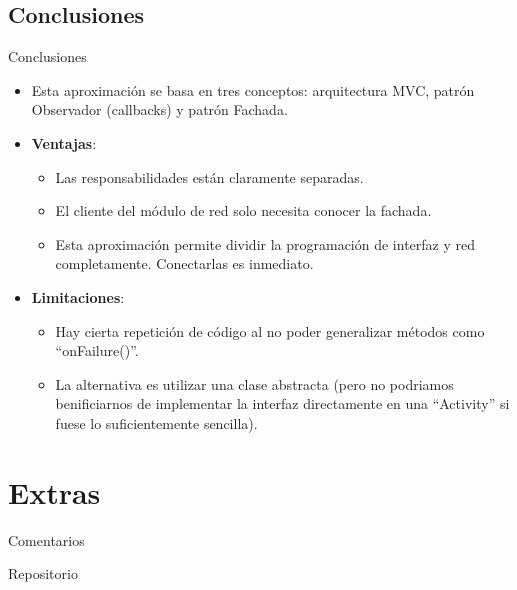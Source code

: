 \documentclass{beamer}
\begin{document}
\subsection{Conclusiones}
\begin{frame}[fragile]{Conclusiones}
\begin{itemize}
\item Esta aproximación se basa en tres conceptos: arquitectura MVC, patrón Observador (callbacks) y patrón Fachada.
\item {\bf Ventajas}:
\begin{itemize}

\item Las responsabilidades están claramente separadas.
\item El cliente del módulo de red solo necesita conocer la fachada.
\item Esta aproximación permite dividir la programación de interfaz y red completamente. Conectarlas es inmediato.
\end{itemize}

\item {\bf Limitaciones}: 
\begin{itemize}
\item Hay cierta repetición de código al no poder generalizar métodos como ``onFailure()''. \item La alternativa es utilizar una clase abstracta (pero no podriamos benificiarnos de implementar la interfaz directamente en una ``Activity'' si fuese lo suficientemente sencilla).
\end{itemize}
\end{itemize}
\end{frame}
\section{Extras}
\begin{frame}{Comentarios}
\end{frame}

\begin{frame}{Repositorio}
\end{frame}
\end{document}
